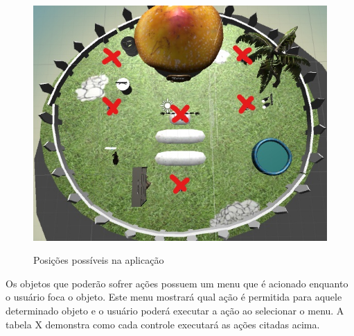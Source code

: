 \begin{figure}[h]
	\caption{\small Posições possíveis na aplicação}
	\centering
	\includegraphics[scale=0.50]{Imagens/posicoes.jpg}
	\label{f.posicoes}
\end{figure}

Os objetos que poderão sofrer ações possuem um menu que é acionado enquanto o usuário foca o objeto. Este menu mostrará qual ação é permitida para aquele determinado objeto e o usuário poderá executar a ação ao selecionar o menu. A tabela X demonstra como cada controle executará as ações citadas acima. 


